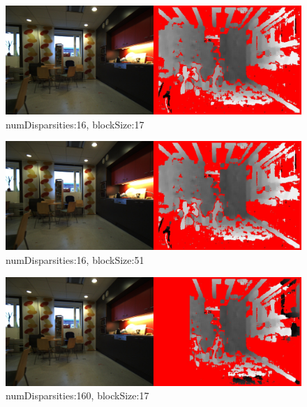 \documentclass{article}
\begin{document}
\begin{figure}[H]
	\includegraphics[width=\textwidth]{n_16_b_17}
	\caption{numDisparsities:16, blockSize:17}
\end{figure}

\begin{figure}[H]
	\includegraphics[width=\textwidth]{n_16_b_17}
	\caption{numDisparsities:16, blockSize:51}
\end{figure}

\begin{figure}[H]
	\includegraphics[width=\textwidth]{n_160_b_17}
	\caption{numDisparsities:160, blockSize:17}
\end{figure}

\clearpage
\end{document}
